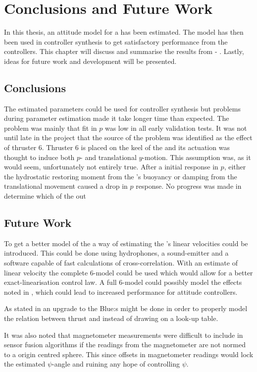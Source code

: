 \chapter{Conclusions and Future Work}\label{cha:conclusions}
In this thesis, an attitude model for a \abbrROV has been estimated. The model has then been used in controller synthesis to get satisfactory performance from the controllers. This chapter will discuss and summarise the results from  - . 
Lastly, ideas for future work and development will be presented.

\section{Conclusions}
The estimated parameters could be used for controller synthesis but problems during parameter estimation made it take longer time than expected. The problem was mainly that fit in $p$ was low in all early validation tests. It was not until late in the project that the source of the problem was identified as the effect of thruster 6. Thruster 6 is  placed on the keel of the \abbrROV and its actuation was thought to induce both $p$- and translational $y$-motion. This assumption was, as it would seem, unfortunately not entirely true. After a initial response in $p$, either the hydrostatic restoring moment from the \abbrROV's buoyancy or damping from the translational movement caused a drop in $p$ response. No progress was made in determine which of the  out     
\section{Future Work}
To get a better model of the \abbrROV a way of estimating the \abbrROV's linear velocities could be introduced. This could be done using hydrophones, a sound-emitter and a software capable of fast calculations of cross-correlation.
With an estimate of linear velocity the complete 6-\abbrDOF model could be used which would allow for a better exact-linearisation control law. A full 6-\abbrDOF model could possibly model the effects noted in , which could lead to increased performance for attitude controllers.

As stated in  an upgrade to the Blue\abbrESC:s might be done in order to properly model the relation between thrust and \abbrRPM instead of drawing on a look-up table.

It was also noted that magnetometer measurements were difficult to include in sensor fusion algorithms if the readings from the magnetometer are not normed to a origin centred sphere. This since offsets in magnetometer readings would lock the estimated $\psi$-angle and ruining any hope of controlling $\psi$. 